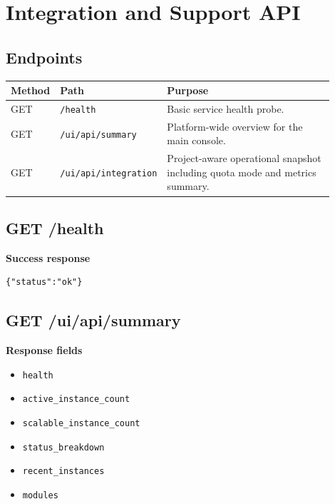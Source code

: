 \documentclass[11pt]{article}
\begin{document}
\section*{Integration and Support API}
\subsection*{Endpoints}
\begin{longtable}{|p{0.14\linewidth}|p{0.24\linewidth}|p{0.52\linewidth}|}
\hline
\textbf{Method} & \textbf{Path} & \textbf{Purpose} \\
\hline
GET & \texttt{/health} & Basic service health probe. \\
\hline
GET & \texttt{/ui/api/summary} & Platform-wide overview for the main console. \\
\hline
GET & \texttt{/ui/api/integration} & Project-aware operational snapshot including quota mode and metrics summary. \\
\hline
\end{longtable}

\subsection*{GET /health}
\textbf{Success response}
\begin{verbatim}
{"status":"ok"}
\end{verbatim}

\subsection*{GET /ui/api/summary}
\textbf{Response fields}
\begin{itemize}
\item \texttt{health}
\item \texttt{active\_instance\_count}
\item \texttt{scalable\_instance\_count}
\item \texttt{status\_breakdown}
\item \texttt{recent\_instances}
\item \texttt{modules}
\end{itemize}
\end{document}
